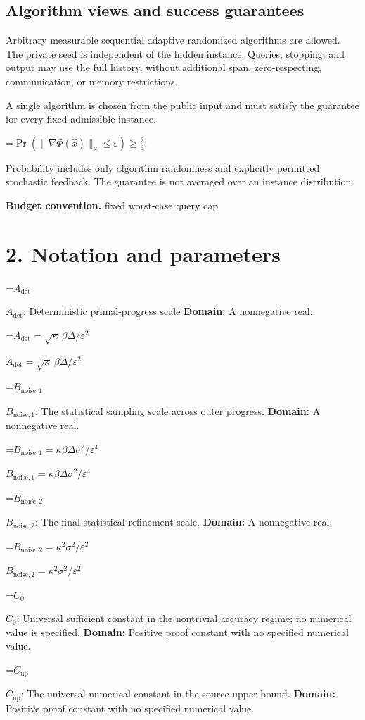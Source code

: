 \documentclass[10pt,a4paper]{article}
\newcommand{\AtlasMath}[1]{\par\begingroup\centering\setbox0=\hbox{$\displaystyle #1$}\ifdim\wd0>1.4\linewidth\typeout{ATLAS WIDE FORMULA: \the\wd0}\fi\ifdim\wd0>\linewidth\resizebox{\linewidth}{!}{\box0}\else\box0\fi\par\endgroup}
\newcommand{\AtlasInlineMath}[1]{\begingroup\setbox0=\hbox{$#1$}\ifdim\wd0>.4\linewidth\endgroup\AtlasMath{#1}\else\endgroup$#1$\fi}
\begin{document}
\subsection{Algorithm views and success guarantees}
Arbitrary measurable sequential adaptive randomized algorithms are allowed. The private seed is independent of the hidden instance. Queries, stopping, and output may use the full history, without additional span, zero-respecting, communication, or memory restrictions.

A single algorithm is chosen from the public input and must satisfy the guarantee for every fixed admissible instance.


\AtlasMath{\Pr\!\left(\|\nabla\Phi(\widehat{x})\|_2\le\varepsilon\right)\ge\frac23.}


Probability includes only algorithm randomness and explicitly permitted stochastic feedback. The guarantee is not averaged over an instance distribution.

\textbf{Budget convention.} fixed worst-case query cap

\section{2. Notation and parameters}
\AtlasInlineMath{A_{\mathrm{det}}}: Deterministic primal-progress scale \textbf{Domain:} A nonnegative real.

\AtlasInlineMath{A_{\mathrm{det}}=\sqrt\kappa\,\beta\Delta/\varepsilon^2}

\AtlasInlineMath{B_{\mathrm{noise},1}}: The statistical sampling scale across outer progress. \textbf{Domain:} A nonnegative real.

\AtlasInlineMath{B_{\mathrm{noise},1}=\kappa\beta\Delta\sigma^2/\varepsilon^4}

\AtlasInlineMath{B_{\mathrm{noise},2}}: The final statistical-refinement scale. \textbf{Domain:} A nonnegative real.

\AtlasInlineMath{B_{\mathrm{noise},2}=\kappa^2\sigma^2/\varepsilon^2}

\AtlasInlineMath{C_0}: Universal sufficient constant in the nontrivial accuracy regime; no numerical value is specified. \textbf{Domain:} Positive proof constant with no specified numerical value.

\AtlasInlineMath{C_{\mathrm{up}}}: The universal numerical constant in the source upper bound. \textbf{Domain:} Positive proof constant with no specified numerical value.
\end{document}

